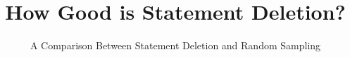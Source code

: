 \title{How Good is Statement Deletion?}
\subtitle{A Comparison Between Statement Deletion and Random Sampling}
